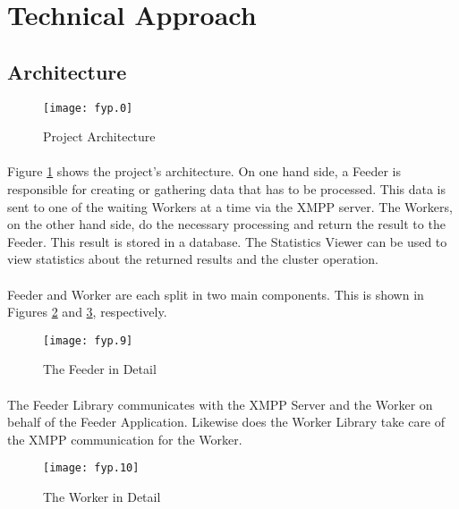 \section{Technical Approach}

\subsection{Architecture}

\begin{figure}[H]
\begin{center}
\texttt{[image: fyp.0]}
\end{center}
\caption{Project Architecture}
\label{fig:architecture}
\end{figure}

\paragraph{}
Figure \ref{fig:architecture} shows the project's architecture. On one hand side, a Feeder is responsible for creating or gathering data that has to be processed. This data is sent to one of the waiting Workers at a time via the XMPP server. The Workers, on the other hand side, do the necessary processing and return the result to the Feeder. This result is stored in a database. The Statistics Viewer can be used to view statistics about the returned results and the cluster operation.

\paragraph{}
Feeder and Worker are each split in two main components. This is shown in Figures \ref{fig:feeder} and \ref{fig:worker}, respectively.

\begin{figure}[H]
\begin{center}
\texttt{[image: fyp.9]}
\end{center}
\caption{The Feeder in Detail}
\label{fig:feeder}
\end{figure}

\paragraph{}
The Feeder Library communicates with the XMPP Server and the Worker on behalf of the Feeder Application. Likewise does the Worker Library take care of the XMPP communication for the Worker.

\begin{figure}[H]
\begin{center}
\texttt{[image: fyp.10]}
\end{center}
\caption{The Worker in Detail}
\label{fig:worker}
\end{figure}

